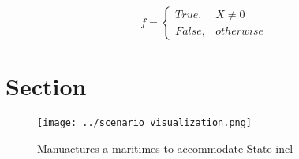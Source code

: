 \documentclass[a4paper]{article}
\begin{document}
\begin{equation}   f =
\begin{cases} True, & X \neq 0\\
False, & otherwise
\end{cases}
\end{equation}

\section{Section}

\begin{figure}
\centering
\texttt{[image: ../scenario\_visualization.png]}
\caption{Manuactures a maritimes to accommodate State incl
}
\end{figure}
 
\end{document}
